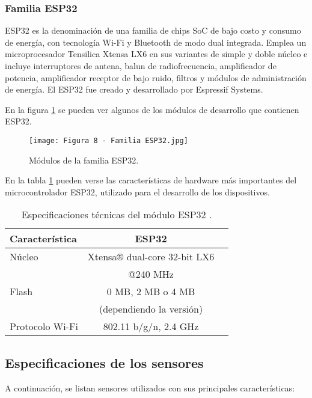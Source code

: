 \subsubsection{Familia ESP32 \citep{13}}

ESP32 es la denominación de una familia de chips SoC de bajo costo y consumo de energía, con tecnología Wi-Fi y Bluetooth de modo dual integrada. Emplea un microprocesador Tensilica Xtensa LX6 en sus variantes de simple y doble núcleo e incluye interruptores de antena, balun de radiofrecuencia, amplificador de potencia, amplificador receptor de bajo ruido, filtros y módulos de administración de energía. El ESP32 fue creado y desarrollado por Espressif Systems.

En la figura \ref{fig:8} se pueden ver algunos de los módulos de desarrollo que contienen ESP32.

\begin{figure}[h]
\centering
\texttt{[image: Figura 8 - Familia ESP32.jpg]}
\caption[Familia ESP32]{Módulos de la familia ESP32. \footnotemark}
\label{fig:8}
\end{figure}

En la tabla \ref{tab:esp32} pueden verse las características de hardware más importantes del microcontrolador ESP32, utilizado para el desarrollo de los dispositivos.

\begin{table}[h]
\centering
\caption[Módulos ESP32]{Especificaciones técnicas del módulo ESP32 \citep{14}.}
\begin{tabular}{l c c}
\toprule
\textbf{Característica} & \textbf{ESP32}\\
\midrule
Núcleo			& Xtensa® dual-core 32-bit LX6\\
				& @240 MHz\\
Flash			& 0 MB, 2 MB o 4 MB\\
				& (dependiendo la versión)\\
Protocolo Wi-Fi	& 802.11 b/g/n, 2.4 GHz\\
\bottomrule
\hline
\end{tabular}
\label{tab:esp32}
\end{table}

\subsection{Especificaciones de los sensores}

A continuación, se listan sensores utilizados con sus principales características:


